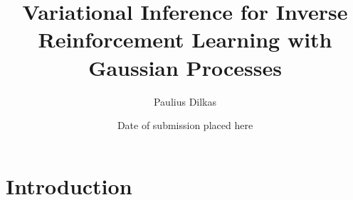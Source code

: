 \documentclass{mprop}
\theoremstyle{definition}
\begin{document}
\title{Variational Inference for Inverse Reinforcement Learning with Gaussian
  Processes}
\author{Paulius Dilkas}
\date{Date of submission placed here} %
\maketitle
\tableofcontents
\newpage

\newcommand{\Kuu}{\mathbf{K}_{\mathbf{u},\mathbf{u}}}
\newcommand{\Krr}{\mathbf{K}_{\mathbf{r},\mathbf{r}}}
\newcommand{\Kru}{\mathbf{K}_{\mathbf{r},\mathbf{u}}}

\newcommand{\DKL}{D_{\mathrm{KL}}}

\newcommand{\pfull}{p(\mathcal{D}, \bm\lambda, \mathbf{X_u}, \mathbf{u}, \mathbf{r})}
\newcommand{\pfullS}{p(\mathcal{D}, \bm\lambda_s, \mathbf{X_u}, \mathbf{u}_s, \mathbf{r}_s)}
\newcommand{\posterior}{p(\bm\lambda, \mathbf{u}, \mathbf{r} | \mathcal{D}, \mathbf{X_u})}
\newcommand{\approximation}{q_{\bm\nu}(\bm\lambda, \mathbf{u}, \mathbf{r})}
\newcommand{\approximationS}{q_{\bm\nu}(\bm\lambda_s, \mathbf{u}_s, \mathbf{r}_s)}

\newcommand{\Eq}{\mathbb{E}_{(\bm\lambda, \mathbf{u}, \mathbf{r}) \sim \approximation}}

\section{Introduction}

\end{document}
